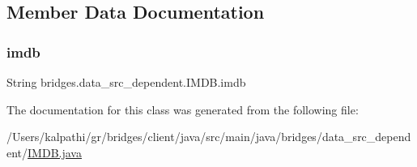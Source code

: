 \subsection{Member Data Documentation}
\mbox{\label{classbridges_1_1data__src__dependent_1_1_i_m_d_b_a2913407abe6019a396d4a2ac086283df}} 
\subsubsection{\texorpdfstring{imdb}{imdb}}
{\footnotesize\ttfamily String bridges.\+data\+\_\+src\+\_\+dependent.\+I\+M\+D\+B.\+imdb\hspace{0.3cm}{\ttfamily [protected]}}



The documentation for this class was generated from the following file\+:\begin{DoxyCompactItemize}
\item 
/\+Users/kalpathi/gr/bridges/client/java/src/main/java/bridges/data\+\_\+src\+\_\+dependent/\mbox{\hyperlink{_i_m_d_b_8java}{I\+M\+D\+B.\+java}}\end{DoxyCompactItemize}
